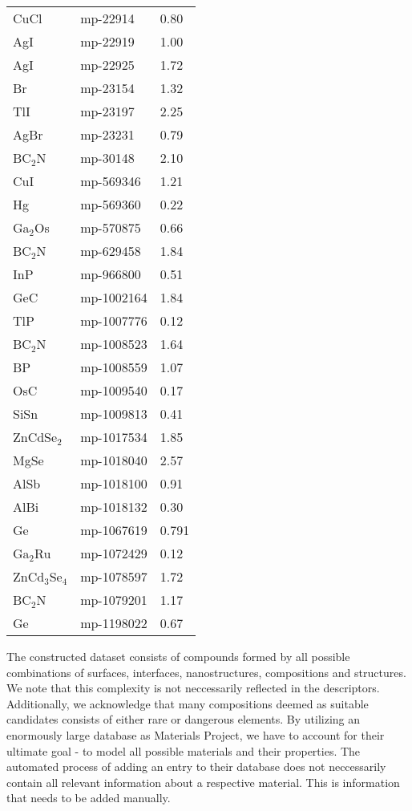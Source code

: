 \begin{center}
\begin{longtable}{M{3.0cm} M{3.0cm} M{3.5cm}}
  CuCl & mp-22914 & 0.80\\
  AgI & mp-22919 & 1.00\\
  AgI & mp-22925 & 1.72\\
  Br & mp-23154 & 1.32\\
  TlI & mp-23197 & 2.25\\
  AgBr & mp-23231 & 0.79\\
  BC$_2$N & mp-30148 & 2.10\\
  CuI & mp-569346 & 1.21\\
  Hg & mp-569360 & 0.22\\
  Ga$_2$Os & mp-570875 & 0.66\\
  BC$_2$N & mp-629458 & 1.84\\
  InP & mp-966800 & 0.51\\
  GeC & mp-1002164 & 1.84\\
  TlP & mp-1007776 & 0.12\\
  BC$_2$N & mp-1008523 & 1.64\\
  BP & mp-1008559 & 1.07\\
  OsC & mp-1009540 & 0.17\\
  SiSn & mp-1009813 & 0.41\\
  ZnCdSe$_2$ & mp-1017534 & 1.85\\
  MgSe & mp-1018040 & 2.57\\
  AlSb & mp-1018100 & 0.91\\
  AlBi & mp-1018132 & 0.30\\
  Ge & mp-1067619 & 0.791\\
  Ga$_2$Ru & mp-1072429 & 0.12\\
  ZnCd$_3$Se$_4$ & mp-1078597 & 1.72\\
  BC$_2$N & mp-1079201 & 1.17\\
  Ge & mp-1198022 & 0.67\\
  \hline
\end{longtable}
\end{center}

The constructed dataset consists of compounds formed by all possible combinations of surfaces, interfaces, nanostructures, compositions and structures. We note that this complexity is not neccessarily reflected in the descriptors. Additionally, we acknowledge that many compositions deemed as suitable candidates consists of either rare or dangerous elements. By utilizing an enormously large database as Materials Project, we have to account for their ultimate goal - to model all possible materials and their properties. The automated process of adding an entry to their database does not neccessarily contain all relevant information about a respective material. This is information that needs to be added manually.


